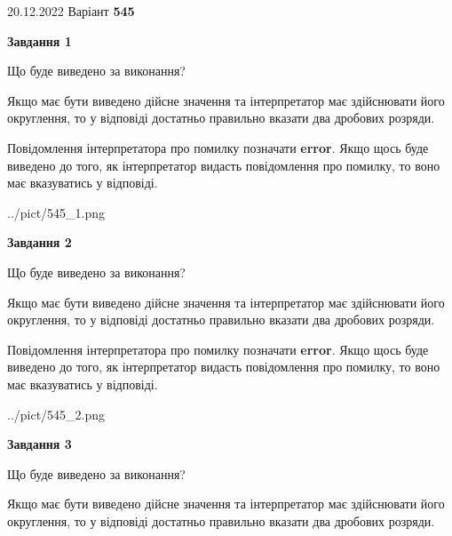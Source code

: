 \documentclass[12pt, ukrainian]{article}
\begin{document}
{20.12.2022 Варіант \No \textbf { 545 }\par}
{
\begin {Large}

{\begin {center}\textbf{Завдання 1}\end {center}}\par
Що буде виведено за виконання? \par

Якщо має бути виведено дійсне значення та інтерпретатор має здійснювати його округлення, 
то у відповіді достатньо правильно вказати два дробових розряди.

Повідомлення інтерпретатора про помилку позначати \textbf{error}.
Якщо щось буде виведено до того, як інтерпретатор видасть повідомлення про помилку, 
то воно має вказуватись у відповіді. \par

\begin{center}
	{../pict/545_1.png}
\end{center}
\newpage

{\begin {center}\textbf{Завдання 2}\end {center}}\par
Що буде виведено за виконання? \par

Якщо має бути виведено дійсне значення та інтерпретатор має здійснювати його округлення, 
то у відповіді достатньо правильно вказати два дробових розряди.

Повідомлення інтерпретатора про помилку позначати \textbf{error}.
Якщо щось буде виведено до того, як інтерпретатор видасть повідомлення про помилку, 
то воно має вказуватись у відповіді. \par

\begin{center}
	{../pict/545_2.png}
\end{center}
\newpage

{\begin {center}\textbf{Завдання 3}\end {center}}\par
Що буде виведено за виконання? \par

Якщо має бути виведено дійсне значення та інтерпретатор має здійснювати його округлення, 
то у відповіді достатньо правильно вказати два дробових розряди.


\end{Large}}
\end{document}
